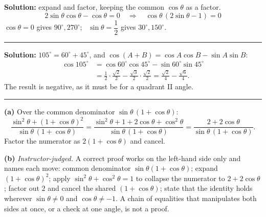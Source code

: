 \documentclass[12pt]{article}
\begin{document}

\textbf{Solution:} expand and factor, keeping the common $\cos\theta$ as a factor.
\[ 2\sin\theta\cos\theta - \cos\theta = 0 \quad\Longrightarrow\quad \cos\theta\,(2\sin\theta - 1) = 0 \]
$\cos\theta = 0$ gives $90^\circ, 270^\circ$; \ $\sin\theta = \dfrac{1}{2}$ gives $30^\circ, 150^\circ$. 

\vspace{0.12cm}\noindent\rule{\linewidth}{0.2pt}\vspace{0.12cm}


\textbf{Solution:} $105^\circ = 60^\circ + 45^\circ$, and $\cos(A + B) = \cos A\cos B - \sin A\sin B$:
\begin{align*}
  \cos 105^\circ &= \cos 60^\circ\cos 45^\circ - \sin 60^\circ\sin 45^\circ \\
  &= \frac{1}{2}\cdot\frac{\sqrt{2}}{2} - \frac{\sqrt{3}}{2}\cdot\frac{\sqrt{2}}{2}
   = \frac{\sqrt{2}}{4} - \frac{\sqrt{6}}{4}.
\end{align*}
The result is negative, as it must be for a quadrant II angle. 

\vspace{0.12cm}\noindent\rule{\linewidth}{0.2pt}\vspace{0.12cm}


\textbf{(a)} Over the common denominator $\sin\theta\,(1 + \cos\theta)$:
\[ \frac{\sin^2\theta + (1 + \cos\theta)^2}{\sin\theta\,(1 + \cos\theta)}
 = \frac{\sin^2\theta + 1 + 2\cos\theta + \cos^2\theta}{\sin\theta\,(1 + \cos\theta)}
 = \frac{2 + 2\cos\theta}{\sin\theta\,(1 + \cos\theta)}. \]
Factor the numerator as $2(1 + \cos\theta)$ and cancel. 

\textbf{(b)} \emph{Instructor-judged.} A correct proof works on the left-hand side only and names each move: common denominator $\sin\theta(1+\cos\theta)$; expand $(1+\cos\theta)^2$; apply $\sin^2\theta + \cos^2\theta = 1$ to collapse the numerator to $2 + 2\cos\theta$; factor out $2$ and cancel the shared $(1 + \cos\theta)$; state that the identity holds wherever $\sin\theta \ne 0$ and $\cos\theta \ne -1$. A chain of equalities that manipulates both sides at once, or a check at one angle, is not a proof.
\end{document}
